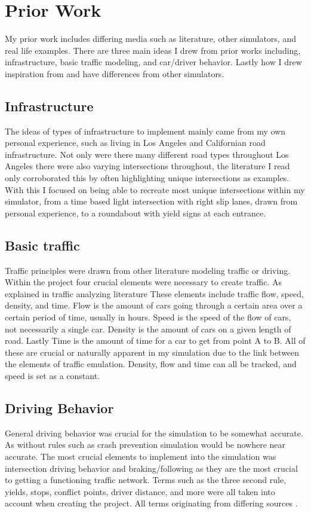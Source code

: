 \documentclass[10pt,twocolumn]{article}
\begin{document}
\section{Prior Work}
\label{Prior Work}
My prior work includes differing media such as literature, other simulators, and real life examples. There are three main ideas I drew from prior works including, infrastructure, basic traffic modeling, and car/driver behavior. Lastly how I drew inspiration from and have differences from other simulators.

\subsection{Infrastructure}
The ideas of types of infrastructure to implement mainly came from my own personal experience, such as living in Los Angeles and Californian road infrastructure. Not only were there many different road types throughout Los Angeles there were also varying intersections throughout, the literature I read only corroborated this by often highlighting unique intersections as examples. With this I focused on being able to recreate most unique intersections within my simulator, from a time based light intersection with right slip lanes, drawn from personal experience, to a roundabout with yield signs at each entrance\cite{StreetElementsToolbox}.\\
\subsection{Basic traffic}
Traffic principles were drawn from other literature modeling traffic or driving. Within the project four crucial elements were necessary to create traffic. As explained in traffic analyzing literature \cite{roadTrafficModeling} These elements include traffic flow, speed, density, and time. Flow is the amount of cars going through a certain area over a certain period of time, usually in hours. Speed is the speed of the flow of cars, not necessarily a single car. Density is the amount of cars on a given length of road. Lastly Time is the amount of time for a car to get from point A to B. All of these are crucial or naturally apparent in my simulation due to the link between the elements of traffic emulation. Density, flow and time can all be tracked, and speed is set as a constant.\\
\subsection{Driving Behavior}
General driving behavior was crucial for the simulation to be somewhat accurate. As without rules such as crash prevention simulation would be nowhere near accurate. The most crucial elements to implement into the simulation was intersection driving behavior and braking/following as they are the most crucial to getting a functioning traffic network. Terms such as the three second rule, yields, stops, conflict points, driver distance, and more were all taken into account when creating the project. All terms originating from differing sources \cite{CADMVDrivingManual}.\\
\end{document}
